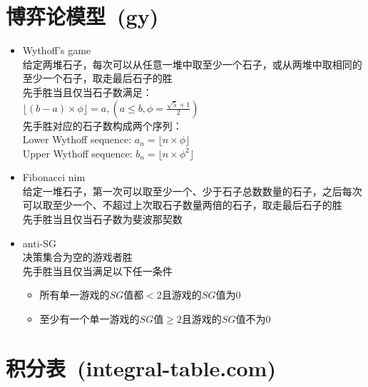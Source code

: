 \section{博弈论模型\ \small(gy)}
	\begin{itemize}[wide=0pt]
		\item Wythoff's game
			\\给定两堆石子，每次可以从任意一堆中取至少一个石子，或从两堆中取相同的至少一个石子，取走最后石子的胜
			\\先手胜当且仅当石子数满足：
			\\$\lfloor (b - a) \times \phi \rfloor=a, (a \leq b, \phi = \frac{\sqrt{5} + 1}{2})$
			\\先手胜对应的石子数构成两个序列：
			\\Lower Wythoff sequence: $a_n = \lfloor n \times \phi \rfloor$
			\\Upper Wythoff sequence: $b_n = \lfloor n \times \phi ^ 2 \rfloor$
		\item Fibonacci nim
			\\给定一堆石子，第一次可以取至少一个、少于石子总数数量的石子，之后每次可以取至少一个、不超过上次取石子数量两倍的石子，取走最后石子的胜
			\\先手胜当且仅当石子数为斐波那契数
		\item anti-SG
			\\决策集合为空的游戏者胜
			\\先手胜当且仅当满足以下任一条件
			\begin{itemize}[nosep,wide=0pt]
				\item 所有单一游戏的$ SG $值都$ < 2 $且游戏的$ SG $值为$ 0 $
				\item 至少有一个单一游戏的$ SG $值$ \geq 2 $且游戏的$ SG $值不为$ 0 $
			\end{itemize}
	\end{itemize}
\section{积分表\ \small(integral-table.com)}
	
